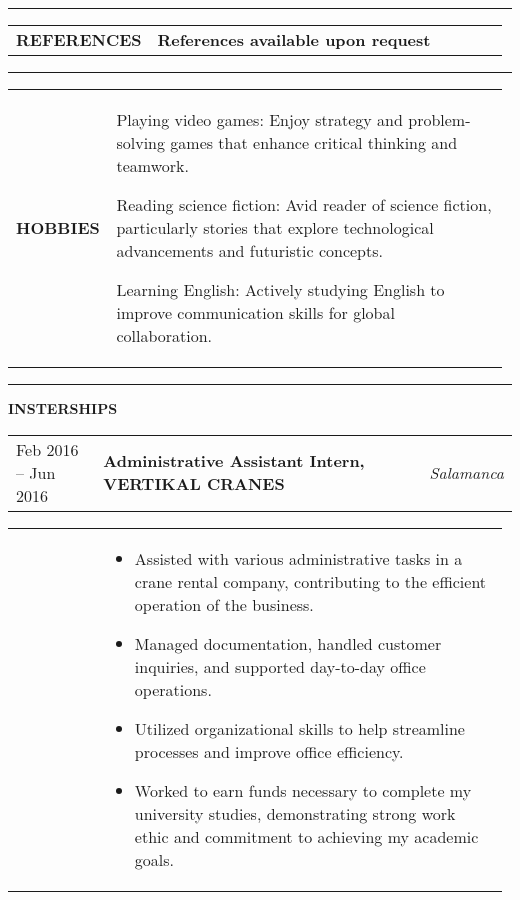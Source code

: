 \documentclass[letter,10pt]{article}
\begin{document}
\vspace{2mm}
\rule{\linewidth}{0.5pt}
\vspace{-4.62mm}
\par
\begin{tabular}{@{} p{0.18\linewidth} p{0.8\linewidth}  @{}}
\textbf{REFERENCES} & 
\centering \textbf{References available upon request}
\end{tabular}

\vspace{2mm}
\rule{\linewidth}{0.5pt}
\vspace{-4.82mm}
\par
\begin{tabular}{@{} p{0.18\linewidth} p{0.798\linewidth}  @{}}
\textbf{HOBBIES} & 
Playing video games: Enjoy strategy and problem-solving games that enhance critical thinking and teamwork.

\vspace{3mm}
Reading science fiction: Avid reader of science fiction, particularly stories that explore technological advancements and futuristic concepts.

\vspace{3mm}
Learning English: Actively studying English to improve communication skills for global collaboration.
\end{tabular}
\vspace{-1mm}
\par
\rule{\linewidth}{0.5pt}
\textbf{INSTERSHIPS}
\vspace{2.5mm}

\begin{tabular}{@{} p{0.18\linewidth} p{0.685\linewidth} p{0.2\linewidth} @{}}
Feb 2016 -- Jun 2016 & \textbf{Administrative Assistant Intern, VERTIKAL CRANES}  & \textit{Salamanca}
\end{tabular}
\vspace{-3mm}
\par
\begin{tabular}{@{} p{0.18\linewidth} p{0.798\linewidth} @{}}
&
\begin{itemize}[leftmargin=*, nosep]
	\item Assisted with various administrative tasks in a crane rental company, contributing to the efficient operation of the business.
 	\item Managed documentation, handled customer inquiries, and supported day-to-day office operations.
	\item Utilized organizational skills to help streamline processes and improve office efficiency.
 	\item Worked to earn funds necessary to complete my university studies, demonstrating strong work ethic and commitment to achieving my academic goals.
\end{itemize}
\end{tabular}
\end{document}
